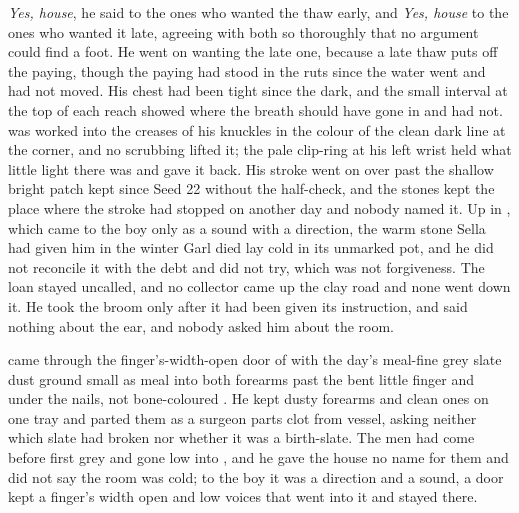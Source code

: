 \emph{Yes, house}, he said to the ones who wanted the thaw early, and \emph{Yes, house} to the ones who wanted it late, agreeing with both so thoroughly that no argument could find a foot. He went on wanting the late one, because a late thaw puts off the paying, though the paying had stood in the ruts since the water went and had not moved. His chest had been tight since the dark, and the small interval at the top of each reach showed where the breath should have gone in and had not.  was worked into the creases of his knuckles in the colour of the clean dark line at the corner, and no scrubbing lifted it; the pale clip-ring at his left wrist held what little light there was and gave it back. His stroke went on over  past the shallow bright patch kept since Seed 22 without the half-check, and the stones kept the place where the stroke had stopped on another day and nobody named it. Up in , which came to the boy only as a sound with a direction, the warm stone Sella had given him in the winter Garl died lay cold in its unmarked pot, and he did not reconcile it with the debt and did not try, which was not forgiveness. The loan stayed uncalled, and no collector came up the clay road and none went down it. He took the broom only after it had been given its instruction, and said nothing about the ear, and nobody asked him about the room.

\scenebreak

 came through the finger's-width-open door of  with the day's meal-fine grey slate dust ground small as meal into both forearms past the bent little finger and under the nails, not bone-coloured . He kept dusty forearms and clean ones on one tray and parted them as a surgeon parts clot from vessel, asking neither which slate had broken nor whether it was a birth-slate. The men had come before first grey and gone low into , and he gave the house no name for them and did not say the room was cold; to the boy it was a direction and a sound, a door kept a finger's width open and low voices that went into it and stayed there.

